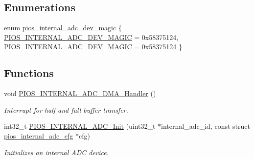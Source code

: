 \subsection*{\-Enumerations}
\begin{DoxyCompactItemize}
\item 
enum \hyperlink{group___p_i_o_s___i_n_t_e_r_n_a_l___a_d_c_gafcbb2d879978c3e1679c3ccabaff8c03}{pios\-\_\-internal\-\_\-adc\-\_\-dev\-\_\-magic} \{ \hyperlink{group___p_i_o_s___a_d_c_ggafcbb2d879978c3e1679c3ccabaff8c03adc16fac7b3b7f2cbaf50a1224b2bbba2}{\-P\-I\-O\-S\-\_\-\-I\-N\-T\-E\-R\-N\-A\-L\-\_\-\-A\-D\-C\-\_\-\-D\-E\-V\-\_\-\-M\-A\-G\-I\-C} =  0x58375124, 
\hyperlink{group___p_i_o_s___a_d_c_ggafcbb2d879978c3e1679c3ccabaff8c03adc16fac7b3b7f2cbaf50a1224b2bbba2}{\-P\-I\-O\-S\-\_\-\-I\-N\-T\-E\-R\-N\-A\-L\-\_\-\-A\-D\-C\-\_\-\-D\-E\-V\-\_\-\-M\-A\-G\-I\-C} =  0x58375124
 \}
\end{DoxyCompactItemize}
\subsection*{\-Functions}
\begin{DoxyCompactItemize}
\item 
void \hyperlink{group___p_i_o_s___i_n_t_e_r_n_a_l___a_d_c_ga5bd59140ceb564b00a50f2f7a499bb7b}{\-P\-I\-O\-S\-\_\-\-I\-N\-T\-E\-R\-N\-A\-L\-\_\-\-A\-D\-C\-\_\-\-D\-M\-A\-\_\-\-Handler} ()
\begin{DoxyCompactList}\small\item\em \-Interrupt for half and full buffer transfer. \end{DoxyCompactList}\item 
int32\-\_\-t \hyperlink{group___p_i_o_s___i_n_t_e_r_n_a_l___a_d_c_ga24dec792533e0f27e35c3ea6d1bbd9e1}{\-P\-I\-O\-S\-\_\-\-I\-N\-T\-E\-R\-N\-A\-L\-\_\-\-A\-D\-C\-\_\-\-Init} (uint32\-\_\-t $\ast$internal\-\_\-adc\-\_\-id, const struct \hyperlink{structpios__internal__adc__cfg}{pios\-\_\-internal\-\_\-adc\-\_\-cfg} $\ast$cfg)
\begin{DoxyCompactList}\small\item\em \-Initializes an internal \-A\-D\-C device. \end{DoxyCompactList}\end{DoxyCompactItemize}
